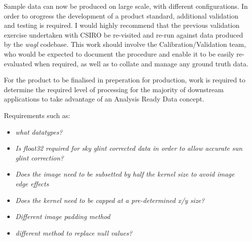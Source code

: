 \documentclass[a4paper]{article}
\begin{document}
    \begin{flushleft}
      Sample data can now be produced on large scale, with different configurations. In order to orogress the development of a product standard, additional validation and testing is required. I would highly recommend that the previous validation exercise undertaken with CSIRO be re-visited and re-run against data produced by the \textit{wagl} codebase. This work should involve the Calibration/Validation team, who would be expected to document the procedure and enable it to be easily re-evaluated when required, as well as to collate and manage any ground truth data. \par
      For the product to be finalised in preperation for production, work is required to determine the required level of processing for the majority of downstream applications to take advantage of an Analysis Ready Data concept. \par

      Requirements such as:
    \end{flushleft}

    \begin{itemize}
      \item \footnotesize{\textit{what datatypes?}}
      \item \footnotesize{\textit{Is float32 required for sky glint corrected data in order to allow accurate sun glint correction?}}
      \item \footnotesize{\textit{Does the image need to be subsetted by half the kernel size to avoid image edge effects}}
      \item \footnotesize{\textit{Does the kernel need to be capped at a pre-determined x/y size?}}
      \item \footnotesize{\textit{Different image padding method}}
      \item \footnotesize{\textit{different method to replace null values?}}
    \end{itemize}
\end{document}
